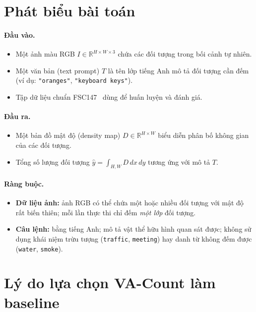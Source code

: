 \documentclass[a4paper,12pt]{report}
\numberwithin{figure}{chapter}
\numberwithin{table}{chapter}
\begin{document}
\section{Phát biểu bài toán}
\label{sec:problem-statement}

\paragraph{Đầu vào.}
\begin{itemize}
    \item Một ảnh màu RGB $I \in \mathbb{R}^{H \times W \times 3}$ chứa các đối tượng trong bối cảnh tự nhiên.
    \item Một văn bản (text prompt) $T$ là tên lớp tiếng Anh mô tả đối tượng cần đếm (ví dụ: \texttt{"oranges"}, \texttt{"keyboard keys"}).
    \item Tập dữ liệu chuẩn FSC147~\cite{ranjan2021fsc147} dùng để huấn luyện và đánh giá.
\end{itemize}

\paragraph{Đầu ra.}
\begin{itemize}
    \item Một bản đồ mật độ (density map) $D \in \mathbb{R}^{H \times W}$ biểu diễn phân bố không gian của các đối tượng.
    \item Tổng số lượng đối tượng $\hat{y} = \int_{H,W} D \, dx\, dy$ tương ứng với mô tả $T$.
\end{itemize}

\paragraph{Ràng buộc.}
\begin{itemize}
    \item \textbf{Dữ liệu ảnh:} ảnh RGB có thể chứa một hoặc nhiều đối tượng với mật độ rất biến thiên; mỗi lần thực thi chỉ đếm \emph{một lớp} đối tượng.
    \item \textbf{Câu lệnh:} bằng tiếng Anh; mô tả vật thể hữu hình quan sát được; không sử dụng khái niệm trừu tượng (\texttt{traffic}, \texttt{meeting}) hay danh từ không đếm được (\texttt{water}, \texttt{smoke}).
\end{itemize}

\section{Lý do lựa chọn VA-Count làm baseline}
\label{sec:why-vacount}
\end{document}
